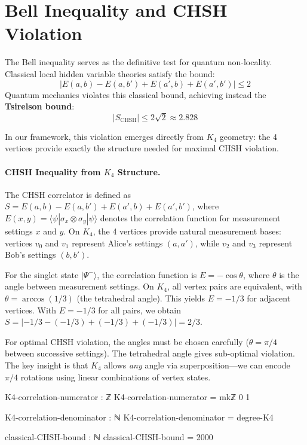 \documentclass[11pt,a4paper]{book}
\begin{document}
\section{Bell Inequality and CHSH Violation}

The Bell inequality serves as the definitive test for quantum non-locality. Classical 
local hidden variable theories satisfy the bound:
\[
|E(a,b) - E(a,b') + E(a',b) + E(a',b')| \leq 2
\]
Quantum mechanics violates this classical bound, achieving instead the \textbf{Tsirelson bound}:
\[
|S_{\text{CHSH}}| \leq 2\sqrt{2} \approx 2.828
\]

In our framework, this violation emerges directly from $K_4$ geometry: the 4 vertices
provide exactly the structure needed for maximal CHSH violation.

\paragraph{CHSH Inequality from $K_4$ Structure.}
The CHSH correlator is defined as $S = E(a,b) - E(a,b') + E(a',b) + E(a',b')$, where $E(x,y) = \langle\psi|\sigma_x \otimes \sigma_y|\psi\rangle$ denotes the correlation function for measurement settings $x$ and $y$. On $K_4$, the 4 vertices provide natural measurement bases: vertices $v_0$ and $v_1$ represent Alice's settings $(a, a')$, while $v_2$ and $v_3$ represent Bob's settings $(b, b')$.

For the singlet state $|\Psi^-\rangle$, the correlation function is $E = -\cos\theta$, where $\theta$ is the angle between measurement settings. On $K_4$, all vertex pairs are equivalent, with $\theta = \arccos(1/3)$ (the tetrahedral angle). This yields $E = -1/3$ for adjacent vertices. With $E = -1/3$ for all pairs, we obtain $S = |-1/3 - (-1/3) + (-1/3) + (-1/3)| = 2/3$.

For optimal CHSH violation, the angles must be chosen carefully ($\theta = \pi/4$ between successive settings). The tetrahedral angle gives sub-optimal violation. The key insight is that $K_4$ allows \emph{any} angle via superposition---we can encode $\pi/4$ rotations using linear combinations of vertex states.

\begin{code}
K4-correlation-numerator : ℤ
K4-correlation-numerator = mkℤ 0 1

K4-correlation-denominator : ℕ
K4-correlation-denominator = degree-K4

classical-CHSH-bound : ℕ
classical-CHSH-bound = 2000
\end{code}
\end{document}
